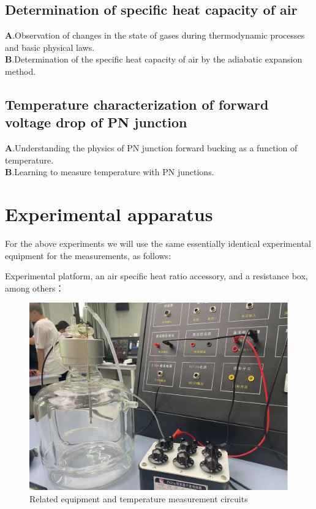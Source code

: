 \documentclass[UTF8]{article}
\begin{document}
	\subsection{Determination of specific heat capacity of air}
   $\bm{A}$.Observation of changes in the state of gases during thermodynamic processes and basic physical laws.\\
   $\bm{B}$.Determination of the specific heat capacity of air by the adiabatic expansion method.\\

   
   \subsection{Temperature characterization of forward voltage drop of PN junction}
      $\bm{A}$.Understanding the physics of PN junction forward bucking as a function of temperature.\\
      $\bm{B}$.Learning to measure temperature with PN junctions.\\

	\section{Experimental apparatus}
	For the above experiments we will use the same essentially identical experimental equipment for the measurements, as follows:
	
	Experimental platform, an air specific heat ratio accessory, and a resistance box, among others：
		\begin{figure}[H]
	\centering
	\includegraphics[clip,scale=0.4,trim={0 0 0 0}]{fig/FIG1.png}
    \caption{Related equipment and temperature measurement circuits}
    \label{figure.1}
        \end{figure} 
\end{document}
